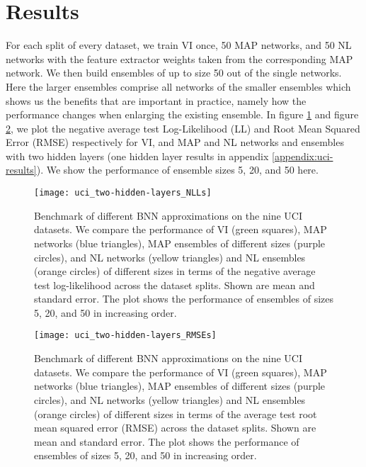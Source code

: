 \documentclass[../thesis.tex]{subfiles}
\begin{document}
\section{Results}
For each split of every dataset, we train VI once, 50 MAP networks, and 50 NL networks with the feature extractor weights taken from the corresponding MAP network. We then build ensembles of up to size 50 out of the single networks. Here the larger ensembles comprise all networks of the smaller ensembles which shows us the benefits that are important in practice, namely how the performance changes when enlarging the existing ensemble. In figure \ref{fig:uci-benchmark-nll} and figure \ref{fig:uci-benchmark-rmse}, we plot the negative average test Log-Likelihood (LL) and Root Mean Squared Error (RMSE) respectively for VI, and MAP and NL networks and ensembles with two hidden layers (one hidden layer results in appendix \ref{appendix:uci-results}). We show the performance of ensemble sizes 5, 20, and 50 here. 
\begin{figure}
    \centering
    \texttt{[image: uci\_two-hidden-layers\_NLLs]} 
    \caption{Benchmark of different BNN approximations on the nine UCI datasets. We compare the performance of VI (green squares), MAP networks (blue triangles), MAP ensembles of different sizes (purple circles), and NL networks (yellow triangles) and NL ensembles (orange circles) of different sizes in terms of the negative average test log-likelihood across the dataset splits. Shown are mean and standard error. The plot shows the performance of ensembles of sizes 5, 20, and 50 in increasing order.}
    \label{fig:uci-benchmark-nll}
\end{figure}

\begin{figure}
    \centering
    \texttt{[image: uci\_two-hidden-layers\_RMSEs]} 
    \caption{Benchmark of different BNN approximations on the nine UCI datasets. We compare the performance of VI (green squares), MAP networks (blue triangles), MAP ensembles of different sizes (purple circles), and NL networks (yellow triangles) and NL ensembles (orange circles) of different sizes in terms of the average test root mean squared error (RMSE) across the dataset splits. Shown are mean and standard error. The plot shows the performance of ensembles of sizes 5, 20, and 50 in increasing order.}
    \label{fig:uci-benchmark-rmse}
\end{figure}
\end{document}
